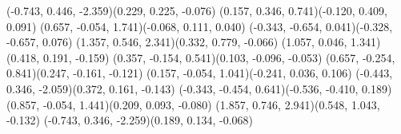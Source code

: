 \pstThreeDLine[linecolor=gray](-0.743, 0.446, -2.359)(0.229, 0.225, -0.076)
\pstThreeDLine[linecolor=black](0.157, 0.346, 0.741)(-0.120, 0.409, 0.091)
\pstThreeDLine[linecolor=black](0.657, -0.054, 1.741)(-0.068, 0.111, 0.040)
\pstThreeDLine[linecolor=gray](-0.343, -0.654, 0.041)(-0.328, -0.657, 0.076)
\pstThreeDLine[linecolor=black](1.357, 0.546, 2.341)(0.332, 0.779, -0.066)
\pstThreeDLine[linecolor=black](1.057, 0.046, 1.341)(0.418, 0.191, -0.159)
\pstThreeDLine[linecolor=black](0.357, -0.154, 0.541)(0.103, -0.096, -0.053)
\pstThreeDLine[linecolor=black](0.657, -0.254, 0.841)(0.247, -0.161, -0.121)
\pstThreeDLine[linecolor=black](0.157, -0.054, 1.041)(-0.241, 0.036, 0.106)
\pstThreeDLine[linecolor=gray](-0.443, 0.346, -2.059)(0.372, 0.161, -0.143)
\pstThreeDLine[linecolor=black](-0.343, -0.454, 0.641)(-0.536, -0.410, 0.189)
\pstThreeDLine[linecolor=black](0.857, -0.054, 1.441)(0.209, 0.093, -0.080)
\pstThreeDLine[linecolor=black](1.857, 0.746, 2.941)(0.548, 1.043, -0.132)
\pstThreeDLine[linecolor=gray](-0.743, 0.346, -2.259)(0.189, 0.134, -0.068)
